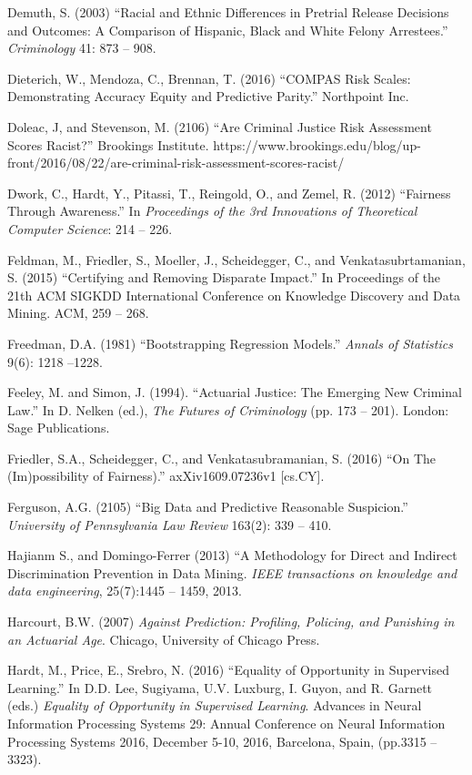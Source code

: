 \documentclass[12pt]{article}
\begin{document}
\begin{description}
\item
Demuth, S. (2003) ``Racial and Ethnic Differences in Pretrial Release Decisions and Outcomes: A Comparison of Hispanic, Black and White Felony Arrestees.'' \textit{Criminology} 41: 873 --  908.
\item
Dieterich, W., Mendoza, C., Brennan, T. (2016) ``COMPAS Risk Scales: Demonstrating Accuracy Equity and Predictive Parity.'' Northpoint Inc. 
\item
Doleac, J, and Stevenson, M. (2106) ``Are Criminal Justice Risk Assessment Scores Racist?'' Brookings Institute. https://www.brookings.edu/blog/up-front/2016/08/22/are-criminal-risk-assessment-scores-racist/
\item
Dwork, C., Hardt, Y., Pitassi, T., Reingold, O., and Zemel, R. (2012) ``Fairness Through Awareness.'' In \textit{Proceedings of the 3rd Innovations of Theoretical Computer Science}: 214 -- 226.
\item
Feldman, M., Friedler, S., Moeller, J., Scheidegger, C., and Venkatasubrtamanian, S. (2015)  ``Certifying and Removing Disparate Impact.'' In Proceedings of the 21th ACM SIGKDD International Conference on Knowledge Discovery and Data Mining. ACM, 259 -- 268.
\item
Freedman, D.A. (1981) ``Bootstrapping Regression Models.'' \textit{Annals of Statistics} 9(6): 1218 --1228.
\item
Feeley, M. and Simon, J. (1994). ``Actuarial Justice: The Emerging New Criminal Law.'' In D. Nelken (ed.), \textit{The Futures of Criminology} (pp. 173 -- 201). London: Sage Publications.
\item
Friedler, S.A., Scheidegger, C., and Venkatasubramanian, S. (2016) ``On The (Im)possibility of Fairness).'' axXiv1609.07236v1 [cs.CY].
\item
Ferguson, A.G. (2105) ``Big Data and Predictive Reasonable Suspicion.'' \textit{University of Pennsylvania Law Review} 163(2): 339 -- 410.
\item
Hajianm S., and Domingo-Ferrer (2013) ``A Methodology for Direct and Indirect Discrimination Prevention in Data Mining. \textit{IEEE transactions on knowledge and data engineering}, 25(7):1445 -- 1459, 2013.
\item
Harcourt, B.W. (2007) \textit{Against Prediction: Profiling, Policing, and Punishing in an Actuarial Age}. Chicago, University of Chicago Press.
\item
Hardt, M., Price, E., Srebro, N. (2016) ``Equality of Opportunity in Supervised Learning.'' In D.D. Lee, Sugiyama, U.V. Luxburg, I.  Guyon, and R. Garnett (eds.) \textit{Equality of Opportunity in Supervised Learning}. Advances in Neural Information Processing Systems 29: Annual Conference  on Neural Information Processing Systems 2016, December 5-10, 2016, Barcelona, Spain, (pp.3315 -- 3323).

\end{description}
\end{document}
